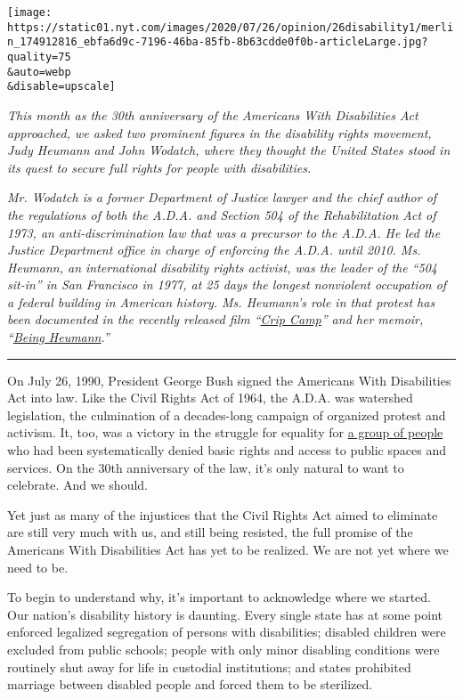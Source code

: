 \texttt{[image: https://static01.nyt.com/images/2020/07/26/opinion/26disability1/merlin\_174912816\_ebfa6d9c-7196-46ba-85fb-8b63cdde0f0b-articleLarge.jpg?quality=75\\\&auto=webp\\\&disable=upscale]}

\emph{This month as the 30th anniversary of the Americans With
Disabilities Act approached, we asked two prominent figures in the
disability rights movement, Judy Heumann and John Wodatch, where they
thought the United States stood in its quest to secure full rights for
people with disabilities.}

\emph{Mr. Wodatch is a former Department of Justice lawyer and the chief
author of the regulations of both the A.D.A. and Section 504 of the
Rehabilitation Act of 1973, an anti-discrimination law that was a
precursor to the A.D.A. He led the Justice Department office in charge
of enforcing the A.D.A. until 2010. Ms. Heumann, an international
disability rights activist, was the leader of the ``504 sit-in'' in San
Francisco in 1977, at 25 days the longest nonviolent occupation of a
federal building in American history. Ms. Heumann's role in that protest
has been documented in the recently released film
``}\href{https://www.nytimes.com/2020/03/24/movies/crip-camp-review.html}{\emph{Crip
Camp}}\emph{'' and her memoir,
``}\href{https://www.penguinrandomhouse.com/books/621090/being-heumann-by-judith-heumann/}{\emph{Being
Heumann}}\emph{.''}

\begin{center}\rule{0.5\linewidth}{\linethickness}\end{center}

On July 26, 1990, President George Bush signed the Americans With
Disabilities Act into law. Like the Civil Rights Act of 1964, the A.D.A.
was watershed legislation, the culmination of a decades-long campaign of
organized protest and activism. It, too, was a victory in the struggle
for equality for
\href{https://www.nytimes.com/2020/07/20/us/judy-heumann-alice-wong-haben-girma-disability-activists.html}{a
group of people} who had been systematically denied basic rights and
access to public spaces and services. On the 30th anniversary of the
law, it's only natural to want to celebrate. And we should.

Yet just as many of the injustices that the Civil Rights Act aimed to
eliminate are still very much with us, and still being resisted, the
full promise of the Americans With Disabilities Act has yet to be
realized. We are not yet where we need to be.

To begin to understand why, it's important to acknowledge where we
started. Our nation's disability history is daunting. Every single state
has at some point enforced legalized segregation of persons with
disabilities; disabled children were excluded from public schools;
people with only minor disabling conditions were routinely shut away for
life in custodial institutions; and states prohibited marriage between
disabled people and forced them to be sterilized.


